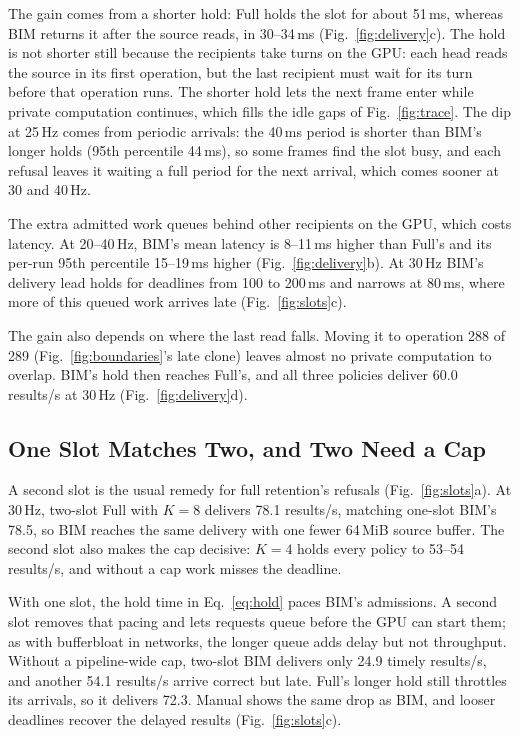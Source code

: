 \documentclass[conference]{IEEEtran}
\newcommand{\MiB}{\,MiB}
\newcommand{\ms}{\,ms}
\newcommand{\Hz}{\,Hz}
\begin{document}
The gain comes from a shorter hold: Full holds the slot for about 51\ms, whereas BIM returns it after the source reads, in 30--34\ms{} (Fig.~\ref{fig:delivery}c). The hold is not shorter still because the recipients take turns on the GPU: each head reads the source in its first operation, but the last recipient must wait for its turn before that operation runs. The shorter hold lets the next frame enter while private computation continues, which fills the idle gaps of Fig.~\ref{fig:trace}. The dip at 25\Hz{} comes from periodic arrivals: the 40\ms{} period is shorter than BIM's longer holds (95th percentile 44\ms), so some frames find the slot busy, and each refusal leaves it waiting a full period for the next arrival, which comes sooner at 30 and 40\Hz.

The extra admitted work queues behind other recipients on the GPU, which costs latency. At 20--40\Hz, BIM's mean latency is 8--11\ms{} higher than Full's and its per-run 95th percentile 15--19\ms{} higher (Fig.~\ref{fig:delivery}b). At 30\Hz{} BIM's delivery lead holds for deadlines from 100 to 200\ms{} and narrows at 80\ms, where more of this queued work arrives late (Fig.~\ref{fig:slots}c).

\label{sec:eval-late}The gain also depends on where the last read falls. Moving it to operation 288 of 289 (Fig.~\ref{fig:boundaries}'s late clone) leaves almost no private computation to overlap. BIM's hold then reaches Full's, and all three policies deliver 60.0 results/s at 30\Hz{} (Fig.~\ref{fig:delivery}d).

\subsection{One Slot Matches Two, and Two Need a Cap}
\label{sec:eval-slots}

A second slot is the usual remedy for full retention's refusals (Fig.~\ref{fig:slots}a). At 30\Hz, two-slot Full with $K{=}8$ delivers 78.1 results/s, matching one-slot BIM's 78.5, so BIM reaches the same delivery with one fewer 64\MiB{} source buffer. The second slot also makes the cap decisive: $K{=}4$ holds every policy to 53--54 results/s, and without a cap work misses the deadline.

With one slot, the hold time in Eq.~\eqref{eq:hold} paces BIM's admissions. A second slot removes that pacing and lets requests queue before the GPU can start them; as with bufferbloat in networks, the longer queue adds delay but not throughput. Without a pipeline-wide cap, two-slot BIM delivers only 24.9 timely results/s, and another 54.1 results/s arrive correct but late. Full's longer hold still throttles its arrivals, so it delivers 72.3. Manual shows the same drop as BIM, and looser deadlines recover the delayed results (Fig.~\ref{fig:slots}c).
\end{document}
